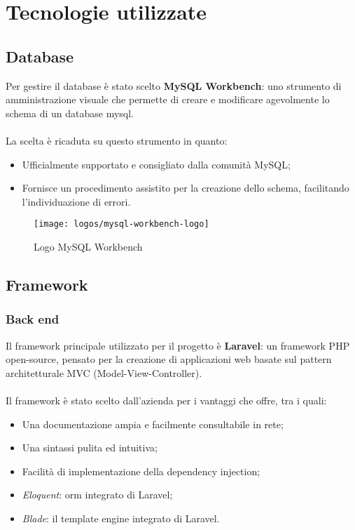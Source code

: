 \section{Tecnologie utilizzate}
\subsection{Database}
Per gestire il database è stato scelto \textbf{MySQL Workbench}: uno strumento di amministrazione visuale che permette di creare e modificare agevolmente lo schema di un database \gls{mysql}\glsfirstoccur{}.
\\ \\
La scelta è ricaduta su questo strumento in quanto: 
\begin{itemize}
	\item Ufficialmente supportato e consigliato dalla comunità MySQL;
	\item Fornisce un procedimento assistito per la creazione dello schema, facilitando l'individuazione di errori.
\end{itemize}

\begin{figure}[htbp]
\begin{center}
\texttt{[image: logos/mysql-workbench-logo]}
\caption{Logo MySQL Workbench}
\end{center}
\end{figure}

\subsection{Framework}
\subsubsection{Back end}
Il framework principale utilizzato per il progetto è \textbf{Laravel}: un framework PHP open-source, pensato per la creazione di applicazioni web basate sul pattern architetturale MVC (Model-View-Controller). 
\\ \\
Il framework è stato scelto dall'azienda per i vantaggi che offre, tra i quali:
\begin{itemize}
	\item Una documentazione ampia e facilmente consultabile in rete;
	\item Una sintassi pulita ed intuitiva;
	\item Facilità di implementazione della dependency injection;
	\item \textit{Eloquent}: \gls{orm}\glsfirstoccur{} integrato di Laravel;
	\item \textit{Blade}: il template engine integrato di Laravel.
\end{itemize}

